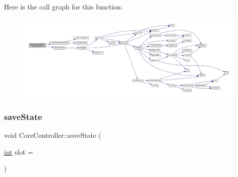 Here is the call graph for this function\+:
\nopagebreak
\begin{figure}[H]
\begin{center}
\leavevmode
\includegraphics[width=350pt]{class_q_g_b_a_1_1_core_controller_abb260a8e1ee3fd1e6eb23586ed864fdc_cgraph}
\end{center}
\end{figure}
\mbox{\label{class_q_g_b_a_1_1_core_controller_a1d7445620b89f8c7a2c4d4d55bc71e60}} 
\subsubsection{\texorpdfstring{save\+State}{saveState}}
{\footnotesize\ttfamily void Core\+Controller\+::save\+State (\begin{DoxyParamCaption}\item[{\mbox{\hyperlink{ioapi_8h_a787fa3cf048117ba7123753c1e74fcd6}{int}}}]{slot = {} }\end{DoxyParamCaption})\hspace{0.3cm}{\ttfamily [slot]}}

